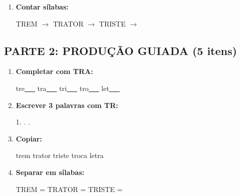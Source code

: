 \begin{exercicio}
\begin{enumerate}
  \item \textbf{Contar sílabas:}
  \begin{center}
  TREM $\rightarrow$ \underline{\hspace{0.9cm}} \quad TRATOR $\rightarrow$ \underline{\hspace{0.9cm}} \quad TRISTE $\rightarrow$ \underline{\hspace{0.9cm}}
  \end{center}

\end{enumerate}

\subsection*{PARTE 2: PRODUÇÃO GUIADA (5 itens)}

\begin{enumerate}[resume]

  \item \textbf{Completar com TRA:}
  \begin{center}
  tre\underline{~~~} \quad tra\underline{~~~} \quad tri\underline{~~~} \quad tro\underline{~~~} \quad let\underline{~~~}
  \end{center}

  \item \textbf{Escrever 3 palavras com TR:}
  \begin{center}
  1. \underline{\hspace{3cm}} . \underline{\hspace{3cm}} . \underline{\hspace{3cm}}
  \end{center}

  \item \textbf{Copiar:}
  \begin{center}
  trem \quad trator \quad triste \quad troca \quad letra
  \end{center}

  \item \textbf{Separar em sílabas:}
  \begin{center}
  TREM = \underline{\hspace{1cm}} \underline{\hspace{1cm}} \quad TRATOR = \underline{\hspace{1cm}} \underline{\hspace{1cm}} \quad TRISTE = \underline{\hspace{1cm}} \underline{\hspace{1cm}}
  \end{center}


\end{enumerate}
\end{exercicio}
